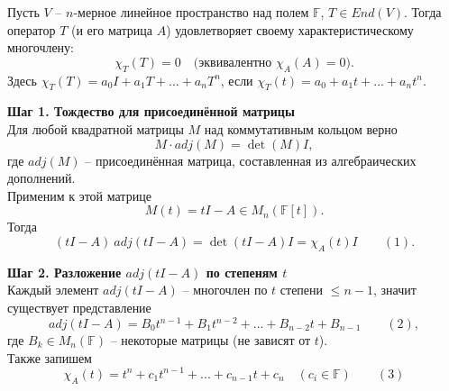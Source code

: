 \documentclass[14pt]{extreport}
\begin{document}
    \begin{thbox}
        Пусть $V$ – $n$-мерное линейное пространство над полем $\mathbb{F}$, $T \in End(V)$. Тогда оператор $T$ (и его матрица $A$) удовлетворяет своему характеристическому многочлену:
        \[
        \chi_T(T) = 0 \quad \text{(эквивалентно $\chi_A(A)=0$).}
        \]
        Здесь $\chi_T(T) = a_0I + a_1T + ... + a_nT^n$, если $\chi_T(t) = a_0 + a_1t + ... + a_nt^n$.
    \end{thbox}

    \begin{prbox}
        \textbf{Шаг 1. Тождество для присоединённой матрицы}\\
        Для любой квадратной матрицы $M$ над коммутативным кольцом верно
        \[
        M \cdot adj(M) = \det(M)I,
        \]
        где $adj(M)$ – присоединённая матрица, составленная из алгебраических дополнений.\\
        Применим к этой матрице
        \[
        M(t) = tI - A \in M_n(\mathbb{F}[t]).
        \]
        Тогда
        \[
        (tI-A)\ adj(tI-A) = \det(tI-A)I = \chi_A(t)I \qquad (1).
        \]

        \textbf{Шаг 2. Разложение $adj(tI-A)$ по степеням $t$}\\
        Каждый элемент $adj(tI-A)$ – многочлен по $t$ степени $\leq n-1$, значит существует представление
        \[
        adj(tI-A) = B_0t^{n-1} + B_1t^{n-2} + ... + B_{n-2}t + B_{n-1} \qquad (2),
        \]
        где $B_k \in M_n(\mathbb{F})$ – некоторые матрицы (не зависят от $t$).\\
        Также запишем
        \[
        \chi_A(t) = t^n + c_1t^{n-1} + ... + c_{n-1}t + c_n \quad (c_i \in \mathbb{F}) \qquad (3)
        \]


\end{prbox}
\end{document}
